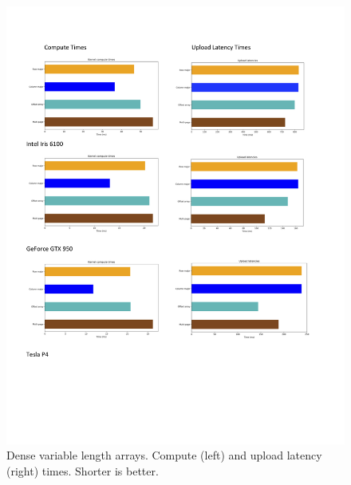 \documentclass[conference]{IEEEtran}
\begin{document}
\begin{figure}
\centering
\includegraphics[scale=0.45]{var_dense.jpg}
\caption{Dense variable length arrays. Compute (left) and upload latency (right) times. Shorter is better.}
\end{figure}

\clearpage
\newpage
\end{document}

